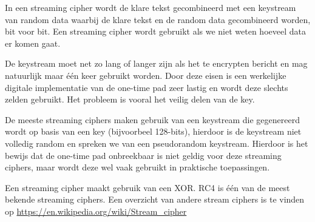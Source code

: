 In een streaming cipher wordt de klare tekst gecombineerd met een keystream van random data waarbij de klare tekst en de random data gecombineerd worden, bit voor bit. Een streaming cipher wordt gebruikt als we niet weten hoeveel data er komen gaat.

De keystream moet net zo lang of langer zijn als het te encrypten bericht en mag natuurlijk maar \'e\'en keer gebruikt worden. Door deze eisen is een werkelijke digitale implementatie van de one-time pad zeer lastig en wordt deze slechts zelden gebruikt. Het probleem is vooral het veilig delen van de key.

De meeste streaming ciphers maken gebruik van een keystream die gegenereerd wordt op basis van een key (bijvoorbeel 128-bits), hierdoor is de keystream niet volledig random en spreken we van een pseudorandom keystream. Hierdoor is het bewijs dat de one-time pad onbreekbaar is niet geldig voor deze streaming ciphers, maar wordt deze wel vaak gebruikt in praktische toepassingen.

Een streaming cipher maakt gebruik van een XOR. RC4 is \'e\'en van de meest bekende streaming ciphers. Een overzicht van andere stream ciphers is te vinden op \url{https://en.wikipedia.org/wiki/Stream_cipher}


